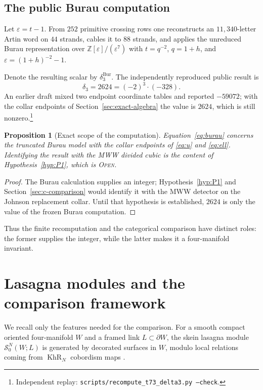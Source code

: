 \documentclass[11pt]{amsart}
\newtheorem{proposition}[theorem]{Proposition}
\theoremstyle{definition}
\theoremstyle{remark}
\newcommand{\Z}{\mathbb{Z}}
\newcommand{\SN}{\mathcal{S}^{N}_{0}}
\newcommand{\KhR}{\operatorname{KhR}}
\newcommand{\Bur}{\mathrm{Bur}}
\newcommand{\Open}{\textnormal{\textsc{Open}}}
\begin{document}
\subsection{The public Burau computation}

Let $\varepsilon=t-1$.  From $252$ primitive crossing rows one reconstructs
an $11{,}340$-letter Artin word on $44$ strands, cables it to $88$ strands,
and applies the unreduced Burau representation over
$\Z[\varepsilon]/(\varepsilon^7)$ with $t=q^{-2}$, $q=1+h$, and
$\varepsilon=(1+h)^{-2}-1$.

Denote the resulting scalar by $\delta_3^{\Bur}$.  The independently
reproduced public result is
\begin{equation}\label{eq:burau}
\delta_3=2624=(-2)^3\cdot(-328).
\end{equation}
An earlier draft mixed two endpoint coordinate tables and reported
$-59072$; with the collar endpoints of Section~\ref{sec:exact-algebra} the
value is $2624$, which is still nonzero.\footnote{Independent replay:
\texttt{scripts/recompute\_t73\_delta3.py --check}.}

\begin{proposition}[Exact scope of the computation]\label{prop:scope}
Equation~\eqref{eq:burau} concerns the truncated Burau model with the collar
endpoints of \eqref{eq:u} and \eqref{eq:ell}.  Identifying the result with
the MWW divided cubic is the content of Hypothesis~\ref{hyp:P1}, which is
\Open.
\end{proposition}

\begin{proof}
The Burau calculation supplies an integer; Hypothesis~\ref{hyp:P1} and
Section~\ref{sec:c-comparison} would identify it with the MWW detector on
the Johnson replacement collar.  Until that hypothesis is established,
$2624$ is only the value of the frozen Burau computation.
\end{proof}

Thus the finite recomputation and the categorical comparison have distinct
roles: the former supplies the integer, while the latter makes it a
four-manifold invariant.



\section{Lasagna modules and the comparison framework}

We recall only the features needed for the comparison.  For a smooth
compact oriented four-manifold $W$ and a framed link $L\subset\partial W$,
the skein lasagna module $\SN(W;L)$ is generated by decorated surfaces in
$W$, modulo local relations coming from $\KhR_N$ cobordism maps
\cite{MorrisonWalkerWedrich2019,ManolescuWalkerWedrich2023}.
\end{document}
